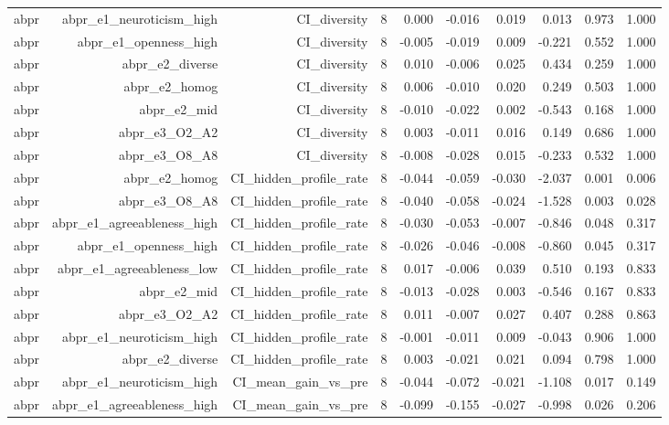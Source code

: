 \documentclass[11pt]{article}
\begin{document}
\begin{landscape}
\begin{longtable}{@{}lrrrrrrrrr@{}}
abpr & abpr\_e1\_neuroticism\_high & CI\_diversity & 8 & 0.000 & -0.016 & 0.019 & 0.013 & 0.973 & 1.000 \\
abpr & abpr\_e1\_openness\_high & CI\_diversity & 8 & -0.005 & -0.019 & 0.009 & -0.221 & 0.552 & 1.000 \\
abpr & abpr\_e2\_diverse & CI\_diversity & 8 & 0.010 & -0.006 & 0.025 & 0.434 & 0.259 & 1.000 \\
abpr & abpr\_e2\_homog & CI\_diversity & 8 & 0.006 & -0.010 & 0.020 & 0.249 & 0.503 & 1.000 \\
abpr & abpr\_e2\_mid & CI\_diversity & 8 & -0.010 & -0.022 & 0.002 & -0.543 & 0.168 & 1.000 \\
abpr & abpr\_e3\_O2\_A2 & CI\_diversity & 8 & 0.003 & -0.011 & 0.016 & 0.149 & 0.686 & 1.000 \\
abpr & abpr\_e3\_O8\_A8 & CI\_diversity & 8 & -0.008 & -0.028 & 0.015 & -0.233 & 0.532 & 1.000 \\
abpr & abpr\_e2\_homog & CI\_hidden\_profile\_rate & 8 & -0.044 & -0.059 & -0.030 & -2.037 & 0.001 & 0.006 \\
abpr & abpr\_e3\_O8\_A8 & CI\_hidden\_profile\_rate & 8 & -0.040 & -0.058 & -0.024 & -1.528 & 0.003 & 0.028 \\
abpr & abpr\_e1\_agreeableness\_high & CI\_hidden\_profile\_rate & 8 & -0.030 & -0.053 & -0.007 & -0.846 & 0.048 & 0.317 \\
abpr & abpr\_e1\_openness\_high & CI\_hidden\_profile\_rate & 8 & -0.026 & -0.046 & -0.008 & -0.860 & 0.045 & 0.317 \\
abpr & abpr\_e1\_agreeableness\_low & CI\_hidden\_profile\_rate & 8 & 0.017 & -0.006 & 0.039 & 0.510 & 0.193 & 0.833 \\
abpr & abpr\_e2\_mid & CI\_hidden\_profile\_rate & 8 & -0.013 & -0.028 & 0.003 & -0.546 & 0.167 & 0.833 \\
abpr & abpr\_e3\_O2\_A2 & CI\_hidden\_profile\_rate & 8 & 0.011 & -0.007 & 0.027 & 0.407 & 0.288 & 0.863 \\
abpr & abpr\_e1\_neuroticism\_high & CI\_hidden\_profile\_rate & 8 & -0.001 & -0.011 & 0.009 & -0.043 & 0.906 & 1.000 \\
abpr & abpr\_e2\_diverse & CI\_hidden\_profile\_rate & 8 & 0.003 & -0.021 & 0.021 & 0.094 & 0.798 & 1.000 \\
abpr & abpr\_e1\_neuroticism\_high & CI\_mean\_gain\_vs\_pre & 8 & -0.044 & -0.072 & -0.021 & -1.108 & 0.017 & 0.149 \\
abpr & abpr\_e1\_agreeableness\_high & CI\_mean\_gain\_vs\_pre & 8 & -0.099 & -0.155 & -0.027 & -0.998 & 0.026 & 0.206 \\

\end{longtable}
\end{landscape}
\end{document}
